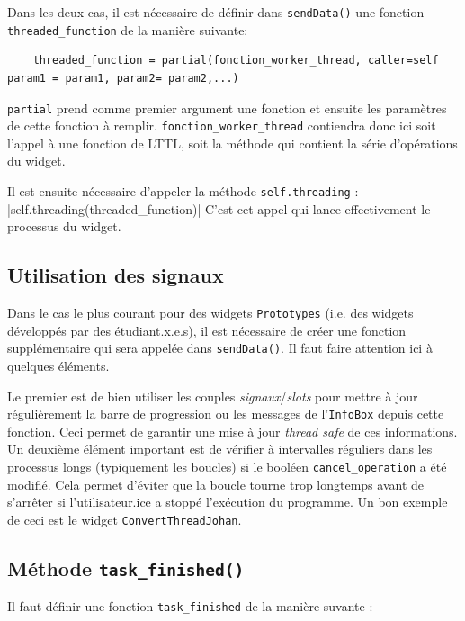 \documentclass{article}
\begin{document}
Dans les deux cas, il est nécessaire de définir dans \texttt{sendData()} une fonction \texttt{threaded\_function} de la manière suivante: 

\begin{verbatim}
    threaded_function = partial(fonction_worker_thread, caller=self param1 = param1, param2= param2,...)
\end{verbatim}

\texttt{partial} prend comme premier argument une fonction et ensuite les paramètres de cette fonction à remplir. \texttt{fonction\_worker\_thread} contiendra donc ici soit l'appel à une fonction de LTTL, soit la méthode qui contient la série d'opérations du widget.

Il est ensuite nécessaire d'appeler la méthode \texttt{self.threading} :
|self.threading(threaded_function)|
C'est cet appel qui lance effectivement le processus du widget.

\subsection{Utilisation des signaux}

Dans le cas le plus courant pour des widgets \texttt{Prototypes} (i.e. des widgets développés par des étudiant.x.e.s), il est nécessaire de créer une fonction supplémentaire qui sera appelée dans \texttt{sendData()}. Il faut faire attention ici à quelques éléments.

Le premier est de bien utiliser les couples \textit{signaux}/\textit{slots} pour mettre à jour régulièrement la barre de progression ou les messages de l'\texttt{InfoBox} depuis cette fonction. Ceci permet de garantir une mise à jour \textit{thread safe} de ces informations. 
Un deuxième élément important est de vérifier à intervalles réguliers dans les processus longs (typiquement les boucles) si le booléen \texttt{cancel\_operation} a été modifié. Cela permet d'éviter que la boucle tourne trop longtemps avant de s'arrêter si l'utilisateur.ice a stoppé l'exécution du programme. Un bon exemple de ceci est le widget \texttt{ConvertThreadJohan}.

\subsection{Méthode \texttt{task\_finished()}}

Il faut définir une fonction \texttt{task\_finished} de la manière suvante :
\end{document}
